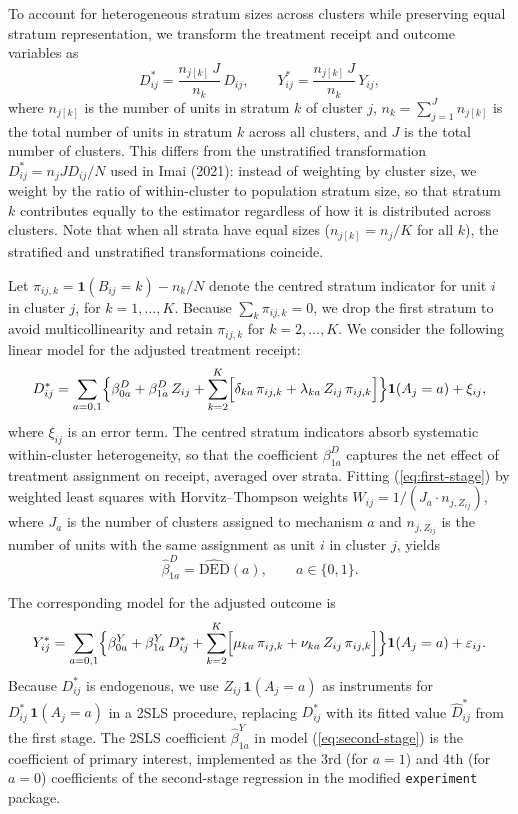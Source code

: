 \documentclass[a4paper, 12pt]{article}
\begin{document}
To account for heterogeneous stratum sizes across clusters while preserving equal stratum representation, we transform the treatment receipt and outcome variables as
$$
D^*_{ij} = \frac{n_{j[k]}\,J}{n_k}\,D_{ij},
\qquad
Y^*_{ij} = \frac{n_{j[k]}\,J}{n_k}\,Y_{ij},
$$
where $n_{j[k]}$ is the number of units in stratum $k$ of cluster $j$, $n_k = \sum_{j=1}^J n_{j[k]}$ is the total number of units in stratum $k$ across all clusters, and $J$ is the total number of clusters. This differs from the unstratified transformation $D^*_{ij} = n_j J D_{ij}/N$ used in Imai (2021): instead of weighting by cluster size, we weight by the ratio of within-cluster to population stratum size, so that stratum $k$ contributes equally to the estimator regardless of how it is distributed across clusters. Note that when all strata have equal sizes ($n_{j[k]} = n_j/K$ for all $k$), the stratified and unstratified transformations coincide.



Let $\pi_{ij,k} = \mathbf{1}(B_{ij}=k) - n_k/N$ denote the centred stratum indicator for unit $i$ in cluster $j$, for $k = 1,\ldots,K$. Because $\sum_k \pi_{ij,k} = 0$, we drop the first stratum to avoid multicollinearity and retain $\pi_{ij,k}$ for $k = 2,\ldots,K$. We consider the following linear model for the adjusted treatment receipt:
\begin{align}
D^*_{ij} = \sum_{a=0,1} \Bigl\{\beta^D_{0a}
           + \beta^D_{1a}\,Z_{ij}
           + \sum_{k=2}^{K}\Bigl[
              \delta_{ka}\,\pi_{ij,k}
            + \lambda_{ka}\,Z_{ij}\,\pi_{ij,k}
            \Bigr]  \Bigr\}\mathbf{1}(A_j = a) + \xi_{ij}, \label{eq:first-stage}
\end{align}
where $\xi_{ij}$ is an error term. The centred stratum indicators absorb systematic within-cluster heterogeneity, so that the coefficient $\beta^D_{1a}$ captures the net effect of treatment assignment on receipt, averaged over strata. Fitting (\ref{eq:first-stage}) by weighted least squares with Horvitz--Thompson weights $W_{ij} = 1/(J_a \cdot n_{j,Z_{ij}})$, where $J_a$ is the number of clusters assigned to mechanism $a$ and $n_{j,Z_{ij}}$ is the number of units with the same assignment as unit $i$ in cluster $j$, yields
$$
\hat{\beta}^D_{1a} = \widehat{\mathrm{DED}}(a), \qquad a \in \{0,1\}.
$$



The corresponding model for the adjusted outcome is
\begin{align}
Y^*_{ij} = \sum_{a=0,1} \Bigl\{\beta^Y_{0a}
           + \beta^Y_{1a}\,D^*_{ij}
           + \sum_{k=2}^{K}\Bigl[
              \mu_{ka}\,\pi_{ij,k}
            + \nu_{ka}\,Z_{ij}\,\pi_{ij,k}
            \Bigr]  \Bigr\}\mathbf{1}(A_j = a) + \varepsilon_{ij}. \label{eq:second-stage}
\end{align}
Because $D^*_{ij}$ is endogenous, we use $Z_{ij}\,\mathbf{1}(A_j=a)$ as instruments for $D^*_{ij}\,\mathbf{1}(A_j=a)$ in a 2SLS procedure, replacing $D^*_{ij}$ with its fitted value $\hat{D}^*_{ij}$ from the first stage. The 2SLS coefficient $\hat{\beta}^Y_{1a}$ in model (\ref{eq:second-stage}) is the coefficient of primary interest, implemented as the 3rd (for $a=1$) and 4th (for $a=0$) coefficients of the second-stage regression in the modified \texttt{experiment} package.
\end{document}

